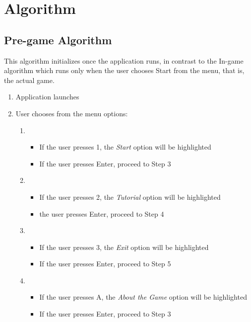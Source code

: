 \section{Algorithm}

\subsection{Pre-game Algorithm}

This algorithm initializes once the application runs, in contrast to the
In-game algorithm which runs only when the user chooses Start from the menu,
that is, the actual game.

\begin{enumerate}
    \item Application launches
    \item User chooses from the menu options:
    \begin{enumerate}[label=\alph*.]
        \item
            \begin{itemize}[label={}]
                \item If the user presses 1, the \emph{Start} option will be highlighted
                \item \hspace{1cm} If the user presses Enter, proceed to Step 3
            \end{itemize}
        \item 
            \begin{itemize}[label={}]
                \item If the user presses 2, the \emph{Tutorial} option will be highlighted
                \item \hspace{1cm} the user presses Enter, proceed to Step 4
            \end{itemize}
        \item 
            \begin{itemize}[label={}]
                \item  If the user presses 3, the \emph{Exit} option will be highlighted
                \item \hspace{1cm} If the user presses Enter, proceed to Step 5
            \end{itemize}
        \item 
            \begin{itemize}[label={}]
                \item  If the user presses A, the \emph{About the Game} option will be highlighted
                \item \hspace{1cm} If the user presses Enter, proceed to Step 3
            \end{itemize}
        

\end{enumerate}
\end{enumerate}
